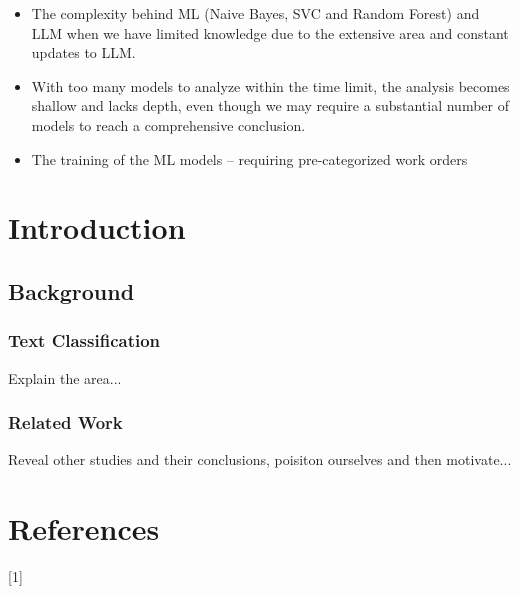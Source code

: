 \documentclass{article}
\begin{document}
\begin{itemize}
      \item The complexity behind ML (Naive Bayes, SVC and Random Forest) and LLM when
            we have limited knowledge due to the extensive area and constant updates to LLM.
      \item With too many models to analyze within the time limit, the analysis becomes
            shallow and lacks depth, even though we may require a substantial number of models
            to reach a comprehensive conclusion.
      \item The training of the ML models -- requiring pre-categorized work orders
\end{itemize}

\section{Introduction}

\subsection{Background}

\subsubsection{Text Classification}
Explain the area...

\subsubsection{Related Work}
Reveal other studies and their conclusions,
poisiton ourselves and then motivate...

\section{References}

 [1]
\end{document}
